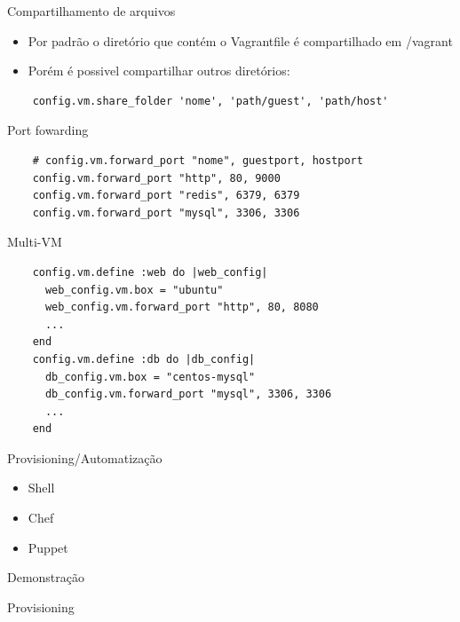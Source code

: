 \documentclass{beamer}
\begin{document}
\begin{frame}[fragile]{Compartilhamento de arquivos}
  \begin{itemize}
    \item Por padrão o diretório que contém o Vagrantfile é compartilhado em /vagrant
    \item Porém é possivel compartilhar outros diretórios:
  \end{itemize}
  \begin{verbatim}
    config.vm.share_folder 'nome', 'path/guest', 'path/host'
  \end{verbatim}
\end{frame}

\begin{frame}[fragile]{Port fowarding}
  \begin{verbatim}
    # config.vm.forward_port "nome", guestport, hostport
    config.vm.forward_port "http", 80, 9000
    config.vm.forward_port "redis", 6379, 6379
    config.vm.forward_port "mysql", 3306, 3306
  \end{verbatim}
\end{frame}

\begin{frame}[fragile]{Multi-VM}
  \begin{verbatim}
    config.vm.define :web do |web_config|
      web_config.vm.box = "ubuntu"
      web_config.vm.forward_port "http", 80, 8080
      ...
    end
    config.vm.define :db do |db_config|
      db_config.vm.box = "centos-mysql"
      db_config.vm.forward_port "mysql", 3306, 3306
      ...
    end
  \end{verbatim}
\end{frame}

\begin{frame}{Provisioning/Automatização}
  \begin{itemize}
    \item Shell
    \item Chef
    \item Puppet
  \end{itemize}
\end{frame}

\begin{frame}[plain,c]
  \begin{center}
    \Huge Demonstração
  \end{center}
  \begin{center}
    Provisioning
  \end{center}
\end{frame}
\end{document}
